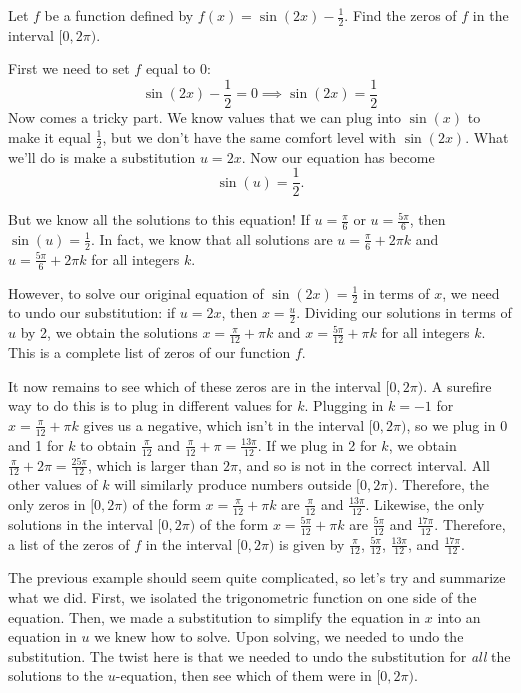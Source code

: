 \documentclass{ximera}
\begin{document}
\begin{example}
Let $f$ be a function defined by $f(x)=\sin(2x) - \frac{1}{2}$. Find the zeros of $f$ in the interval $[0, 2\pi)$.
\begin{explanation}
First we need to set $f$ equal to $0$:
$$\sin(2x) - \frac{1}{2} = 0 \implies \sin(2x) = \frac{1}{2}$$
Now comes a tricky part. We know values that we can plug into $\sin(x)$ to make it equal $\frac{1}{2}$, but we don't have the same comfort level with $\sin(2x)$. What we'll do is make a substitution $u = 2x$. Now our equation has become
$$\sin(u) = \frac{1}{2}.$$

But we know all the solutions to this equation! If $u = \frac{\pi}{6}$ or $u = \frac{5\pi}{6}$, then $\sin(u) = \frac{1}{2}$. In fact, we know that all solutions are $u = \frac{\pi}{6} + 2\pi k$ and $u = \frac{5\pi}{6} + 2\pi k$ for all integers $k$.

However, to solve our original equation of $\sin(2x) = \frac{1}{2}$ in terms of $x$, we need to undo our substitution: if $u = 2x$, then $x = \frac{u}{2}$. Dividing our solutions in terms of $u$ by 2, we obtain the solutions $x = \frac{\pi}{12} + \pi k$ and $x = \frac{5\pi}{12} + \pi k$ for all integers $k$. This is a complete list of zeros of our function $f$.   

It now remains to see which of these zeros are in the interval $[0, 2\pi)$. A surefire way to do this is to plug in different values for $k$. Plugging in $k = -1$ for $x = \frac{\pi}{12} + \pi k$ gives us a negative, which isn't in the interval $[0, 2\pi)$, so we plug in 0 and 1 for $k$ to obtain $\frac{\pi}{12}$ and $\frac{\pi}{12} + \pi = \frac{13\pi}{12}$. If we plug in 2 for $k$, we obtain $\frac{\pi}{12} + 2\pi = \frac{25\pi}{12}$, which is larger than $2\pi$, and so is not in the correct interval. All other values of $k$ will similarly produce numbers outside $[0, 2\pi)$. Therefore, the only zeros in $[0, 2\pi)$ of the form $x = \frac{\pi}{12} + \pi k$ are $\frac{\pi}{12}$ and $\frac{13\pi}{12}$. Likewise, the only solutions in the interval $[0, 2\pi)$ of the form $x = \frac{5\pi}{12} + \pi k$ are $\frac{5\pi}{12}$ and $\frac{17\pi}{12}$. Therefore, a list of the zeros of $f$ in the interval $[0, 2\pi)$ is given by $\frac{\pi}{12}$, $\frac{5\pi}{12}$, $\frac{13\pi}{12}$, and $\frac{17\pi}{12}$. 
\end{explanation}
\end{example}

The previous example should seem quite complicated, so let's try and summarize what we did. First, we isolated the trigonometric function on one side of the equation. Then, we made a substitution to simplify the equation in $x$ into an equation in $u$ we knew how to solve. Upon solving, we needed to undo the substitution. The twist here is that we needed to undo the substitution for \emph{all} the solutions to the $u$-equation, then see which of them were in $[0, 2\pi)$. 
\end{document}
